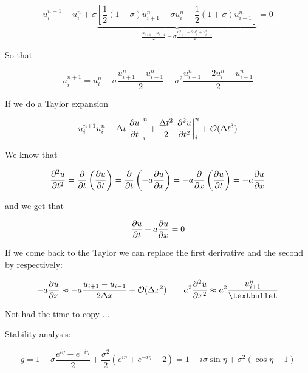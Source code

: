 \begin{equation}
u_i^{n+1} - u_i ^n + \sigma \underbrace{\left[ \frac{1}{2}(1-\sigma)u_{i+1}^n + \sigma u_i ^n - \frac{1}{2} (1+\sigma) u _{i-1}^n \right]}_{\frac{u_{i+1}- u _{i-1}}{2} - \sigma \frac{u_{i+1}^n - 2u_i ^n + u_{i-1}^n}{2}} = 0
\end{equation}

So that

\begin{equation}
u_i^{n+1} = u_i^n - \sigma \frac{u_{i+1}^n - u_{i-1}^n}{2} + \sigma ^2 \frac{u_{i+1}^n - 2u_i^n + u_{i-1}^n}{2}
\end{equation}

If we do a Taylor expansion 

\begin{equation}
u_{i}^{n+1}  u_i^n + \Delta t \left. \frac{\partial u}{\partial t} \right|^n_i + \frac{\Delta t^2}{2} \left. \frac{\partial ^2 u}{\partial t^2} \right| ^n_i  + \mathcal{O}(\Delta t^3)
\end{equation}

We know that 

\begin{equation}
\frac{\partial ^2 u}{\partial t^2} = \frac{\partial}{\partial t}\left(\frac{\partial u}{\partial t} \right) = \frac{\partial }{\partial t} \left( -a \frac{\partial u}{\partial x} \right) = -a \frac{\partial}{\partial x} \left( \frac{\partial u }{\partial t} \right) = - a \frac{\partial u }{\partial x}
\end{equation}

and we get that 

\begin{equation}
\frac{\partial u}{\partial t} + a \frac{\partial u}{\partial x} = 0
\end{equation}

If we come back to the Taylor we can replace the first derivative and the second by respectively: 

\begin{equation}
-a \frac{\D u}{\D x} \approx -a \frac{u_{i+1}-u_{i-1}}{2\Delta x} + \mathcal{O}(\Delta x^2) \qquad a^2\frac{\D ^2 u}{\D x^2} \approx a^2 \frac{u_{i+1}^n}{•}
\end{equation}

Not had the time to copy ...

Stability analysis: 

\begin{equation}
g = 1 - \sigma \frac{e^{i\eta} - e^{-i\eta}}{2} + \frac{\sigma ^2}{2} (e^{i\eta} + e^{-i\eta}-2) = 1 - i \sigma \sin \eta + \sigma ^2 (\cos \eta -1)
\end{equation}

